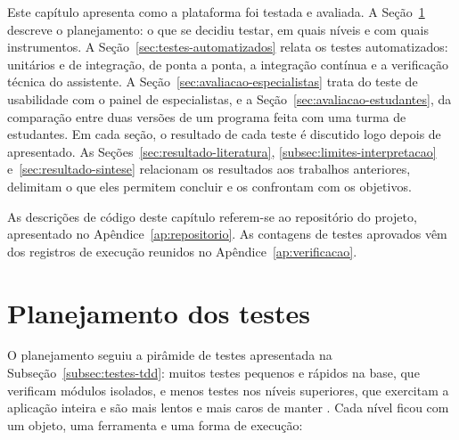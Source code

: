 Este capítulo apresenta como a plataforma foi testada e avaliada. A Seção~\ref{sec:planejamento-testes} descreve o planejamento: o que se decidiu testar, em quais níveis e com quais instrumentos. A Seção~\ref{sec:testes-automatizados} relata os testes automatizados: unitários e de integração, de ponta a ponta, a integração contínua e a verificação técnica do assistente. A Seção~\ref{sec:avaliacao-especialistas} trata do teste de usabilidade com o painel de especialistas, e a Seção~\ref{sec:avaliacao-estudantes}, da comparação entre duas versões de um programa feita com uma turma de estudantes. Em cada seção, o resultado de cada teste é discutido logo depois de apresentado. As Seções~\ref{sec:resultado-literatura}, \ref{subsec:limites-interpretacao} e~\ref{sec:resultado-sintese} relacionam os resultados aos trabalhos anteriores, delimitam o que eles permitem concluir e os confrontam com os objetivos.

As descrições de código deste capítulo referem-se ao repositório do projeto, apresentado no Apêndice~\ref{ap:repositorio}. As contagens de testes aprovados vêm dos registros de execução reunidos no Apêndice~\ref{ap:verificacao}.

\section{Planejamento dos testes}
\label{sec:planejamento-testes}

O planejamento seguiu a pirâmide de testes apresentada na Subseção~\ref{subsec:testes-tdd}: muitos testes pequenos e rápidos na base, que verificam módulos isolados, e menos testes nos níveis superiores, que exercitam a aplicação inteira e são mais lentos e mais caros de manter \cite{vocke2018pyramid}. Cada nível ficou com um objeto, uma ferramenta e uma forma de execução:

